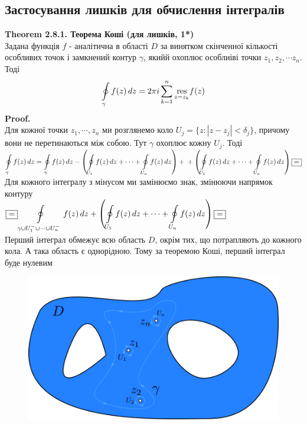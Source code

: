 \documentclass[a4paper, 14pt]{extarticle}
\def\residue#1#2{\underset{z = {#1}}{\textrm{res}} {#2}}
\begin{document}
\subsection{Застосування лишків для обчислення інтегралів}
\textbf{Theorem 2.8.1. Теорема Коші (для лишків, 1*)}\\
Задана функція $f$ - аналітична в області $D$ за винятком скінченної кількості особливих точок і замкнений контур $\gamma$, якийй охоплює особлиіві точки $z_1,z_2,\cdots z_n$. Тоді
\begin{align*}
\oint\displaylimits_{\gamma} f(z)\,dz = 2 \pi i \sum_{k=1}^{n} \residue{z_k}{f(z)}
\end{align*}
\textbf{Proof.}\\
Для кожної точки $z_1,\cdots, z_n$ ми розглянемо коло $U_j = \{z: |z-z_j|<\delta_j\}$, причому вони не перетинаються між собою. Тут $\gamma$ охоплює кожну $U_j$. Тоді\\
$\displaystyle\oint\displaylimits_{\gamma} f(z)\,dz = \oint\displaylimits_{\gamma} f(z)\,dz - \left(\oint\displaylimits_{U_1} f(z)\,dz + \cdots + \oint\displaylimits_{U_n} f(z)\,dz   \right) +\\ + \left(\oint\displaylimits_{U_1} f(z)\,dz + \cdots + \oint\displaylimits_{U_n} f(z)\,dz   \right) \boxed{=}$ \\
Для кожного інтегралу з мінусом ми замінюємо знак, змінюючи напрямок контуру\\
$\boxed{=} \displaystyle \oint\displaylimits_{\gamma \cup U_1^- \cup \cdots \cup U_n^-} f(z)\,dz + \left(\oint\displaylimits_{U_1} f(z)\,dz + \cdots + \oint\displaylimits_{U_n} f(z)\,dz   \right) \boxed{=} $\\
Перший інтеграл обмежує всю область $D$, окрім тих, що потрапляють до кожного кола. А така область є однорідною. Тому за теоремою Коші, перший інтеграл буде нулевим\\
	\begin{figure}[h]
	\includegraphics[scale = 1]{path1377.png}
	\caption{}
	\end{figure}
\end{document}
